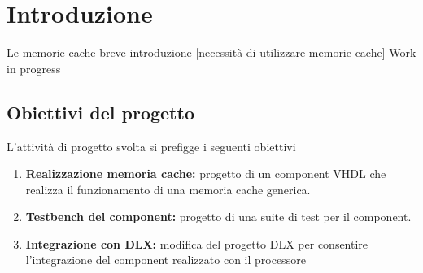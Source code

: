 \clearpage{\pagestyle{empty}\cleardoublepage}
\chapter*{Introduzione} 


Le memorie cache breve introduzione [necessit\`a di utilizzare memorie cache]
Work in progress


\section{Obiettivi del progetto}
L'attivit\`a di progetto svolta si prefigge i seguenti obiettivi

\begin{enumerate}

\item \textbf{Realizzazione memoria cache:}
progetto di un component VHDL che realizza il funzionamento di una memoria cache generica.

\item \textbf{Testbench del component:} progetto di una suite di test per il component.

\item \textbf{Integrazione con DLX:} modifica del progetto DLX per consentire l'integrazione del component realizzato con il processore

\end{enumerate}